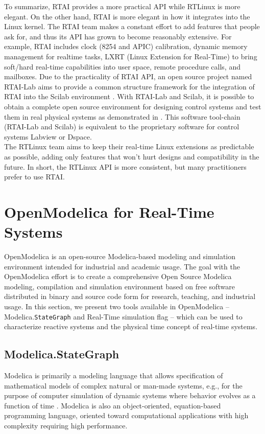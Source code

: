 \documentclass[12pt]{report}
\begin{document}
To summarize, RTAI provides a more practical API while RTLinux is more elegant. On the other hand, RTAI is more elegant in how it integrates into the Linux kernel. The RTAI team makes a constant effort to add features that people ask for, and thus its API has grown to become reasonably extensive. For example, RTAI includes clock (8254 and APIC) calibration, dynamic memory management for realtime tasks, LXRT (Linux Extension for Real-Time) to bring soft/hard real-time capabilities into user space, remote procedure calls, and mailboxes. Due to the practicality of RTAI API,  an open source project named  RTAI-Lab aims to provide a common structure framework for the integration of RTAI into the Scilab environment \cite{scilab-rtai}. With RTAI-Lab and Scilab, it is possible to obtain a complete open source environment for designing control systems and test them in real physical systems as demonstrated in \cite{scilab-rtai}. This software tool-chain (RTAI-Lab and Scilab) is equivalent to the proprietary software for control systems Labview or Dspace.\\ 

The RTLinux team aims to keep their real-time Linux extensions as predictable as possible, adding only features that won't hurt designs and compatibility in the future. In short, the RTLinux API is more consistent, but many practitioners prefer to use RTAI.  

\section{OpenModelica for Real-Time Systems}
OpenModelica \cite{OM} is an open-source Modelica-based modeling and simulation environment intended for industrial and academic usage. The goal with the OpenModelica effort is to create a comprehensive Open Source Modelica modeling, compilation and simulation environment based on free software distributed in binary and source code form for research, teaching, and industrial usage. In this section, we present two tools available in OpenModelica -- Modelica.\texttt{StateGraph} and Real-Time simulation flag -- which can be used to characterize reactive systems and the physical time concept of real-time systems. 

\subsection{Modelica.StateGraph}
Modelica is primarily a modeling language that allows specification of mathematical models of complex natural or man-made systems, e.g., for the purpose of computer simulation of dynamic systems
where behavior evolves as a function of time \cite{OMbook}. Modelica is also an object-oriented, equation-based programming language, oriented toward computational applications with high complexity requiring high performance.
\end{document}
